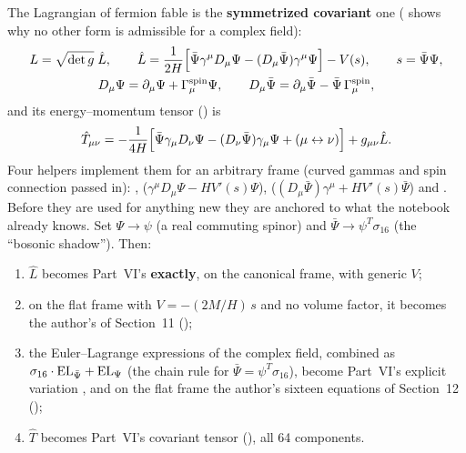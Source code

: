 The Lagrangian of fermion fable is the \textbf{symmetrized covariant} one ( shows why
no other form is admissible for a complex field):
\begin{gather*}
  L=\sqrt{\det g}\;\hat L,\qquad
  \hat L=\frac{1}{2H}\Bigl[\bar\Psi\gamma^\mu D_\mu\Psi-(D_\mu\bar\Psi)\gamma^\mu\Psi\Bigr]-V(s),\qquad s=\bar\Psi\Psi,\\
  D_\mu\Psi=\partial_\mu\Psi+\Gamma^{\mathrm{spin}}_\mu\Psi,\qquad
  D_\mu\bar\Psi=\partial_\mu\bar\Psi-\bar\Psi\,\Gamma^{\mathrm{spin}}_\mu ,
\end{gather*}
and its energy--momentum tensor () is
\[
  \hat T_{\mu\nu}=-\frac{1}{4H}\Bigl[\bar\Psi\gamma_\mu D_\nu\Psi-(D_\nu\bar\Psi)\gamma_\mu\Psi+(\mu\leftrightarrow\nu)\Bigr]+g_{\mu\nu}\hat L .
\]
Four helpers implement them for an arbitrary frame (curved gammas and spin connection passed in):
,  ($\gamma^\mu D_\mu\Psi-HV'(s)\Psi$),
 ($(D_\mu\bar\Psi)\gamma^\mu+HV'(s)\bar\Psi$) and
. Before they are used for anything new they are anchored to what the notebook
already knows. Set $\Psi\to\psi$ (a real commuting spinor) and $\bar\Psi\to\psi^{T}\sigma_{16}$ (the
``bosonic shadow''). Then:
\begin{enumerate}
  \item $\hat L$ becomes Part~VI's  \textbf{exactly}, on the canonical frame,
        with generic $V$;
  \item on the flat frame with $V=-(2M/H)\,s$ and no volume factor, it becomes the author's
         of Section~11 ();
  \item the Euler--Lagrange expressions of the complex field, combined as
        $\sigma_{16}\cdot\mathrm{EL}_{\bar\Psi}+\mathrm{EL}_{\Psi}$ (the chain rule for
        $\bar\Psi=\psi^{T}\sigma_{16}$), become Part~VI's explicit variation ,
        and on the flat frame the author's sixteen equations  of Section~12
        ();
  \item $\hat T$ becomes Part~VI's covariant tensor  (), all 64
        components.
\end{enumerate}
